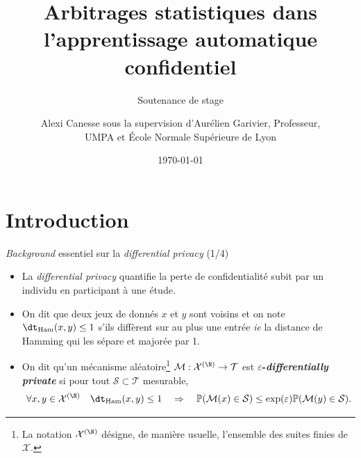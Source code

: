 \documentclass[10pt,serif]{beamer}
\title[Arbitrages statistiques confidentiel] %
{Arbitrages statistiques dans l'apprentissage automatique confidentiel}
\subtitle{Soutenance de stage}
\author[Alexi Canesse]{{Alexi \sc Canesse} sous la supervision d'{Aurélien \sc Garivier}, Professeur,\\ UMPA et École Normale Supérieure de Lyon}
\institute[ÉNS de Lyon] %
{
  Stage de recherche effectué à l'UMPA dans le cadre de la \\
        L3 informatique fondamental de l'ÉNS de Lyon
}
\date[Soutenance de stage] %
{\today}
\begin{document}
% 


\begin{frame}
  \titlepage
\end{frame}



\section{Introduction}
  \begin{frame}{\textit{Background} essentiel sur la \textit{differential privacy} (1/4)}
    \begin{itemize}
      \item La \textit{differential privacy} \cite{10.1007/11681878_14} quantifie la perte de confidentialité subit par un individu en participant à une étude. 

      \item<2->\begin{definition}
          On dit que deux jeux de donnés \(x\) et \(y\) sont voisins et on note \(\dt_{\text{Ham}}(x,y) \leq 1\) s'ils diffèrent sur au plus une entrée \textit{ie} la distance de {\sc Hamming} qui les sépare et majorée par 1.
      \end{definition}
       
      
      \item<3->\begin{definition}
          On dit qu'un mécanisme aléatoire\footnote{La notation \(\mathcal X^{(\N)}\) désigne, de manière usuelle, l'ensemble des suites finies de \(\mathcal X\).} \(\mathcal M :\mathcal X^{(\N)} \to \mathcal T\) est \textbf{\(\varepsilon\)-\textit{differentially private}} si pour tout \(\mathcal S \subset \mathcal T \) mesurable, 
          \[
              \forall x,y \in \mathcal X^{(\N)} \quad \dt_{\text{Ham}}(x,y) \leq 1 \quad \Rightarrow \quad \mathbb P(\mathcal M(x) \in \mathcal S) \leq \exp(\varepsilon)  \mathbb P(\mathcal M(y) \in \mathcal S).
          \]
      \end{definition}
    \end{itemize}
  \end{frame}
\end{document}
